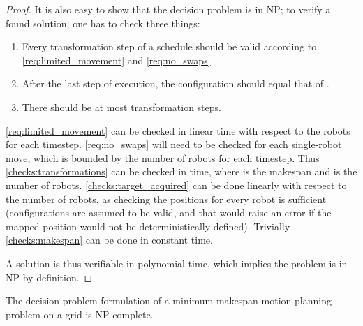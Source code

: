 \begin{proof}
	It is also easy to show that the decision problem is in NP; to verify a found solution, one has to check three things:
	\begin{enumerate}
		\item Every transformation step of a schedule should be valid according to \cref{req:limited_movement} and \cref{req:no_swaps}.\label{checks:transformations}
		\item After the last step of execution, the configuration should equal that of .\label{checks:target_acquired}
		\item There should be at most  transformation steps.\label{checks:makespan}
	\end{enumerate}
	\cref{req:limited_movement} can be checked in linear time with respect to the robots for each timestep. \cref{req:no_swaps} will need to be checked for each single-robot move, which is bounded by the number of robots for each timestep. Thus \cref{checks:transformations} can be checked in  time, where  is the makespan and  is the number of robots. \cref{checks:target_acquired} can be done linearly with respect to the number of robots, as checking the positions for every robot is sufficient (configurations are assumed to be valid, and that  would raise an error if the mapped position would not be deterministically defined). Trivially \cref{checks:makespan} can be done in constant time. 

	A solution is thus verifiable in polynomial time, which implies the problem is in NP by definition.
\end{proof}

\begin{theorem}\label{thm:npc}
	The decision problem formulation of a minimum makespan motion planning problem on a grid is NP-complete.
\end{theorem}

